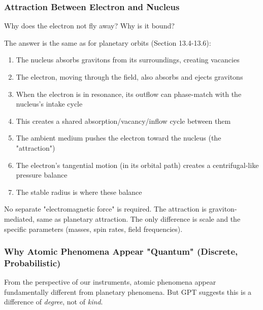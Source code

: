 \documentclass[12pt, a4paper]{article}
\begin{document}
\subsubsection{Attraction Between Electron and Nucleus}
\label{subsec:electron_attraction}

Why does the electron not fly away? Why is it bound?

The answer is the same as for planetary orbits (Section 13.4-13.6):

\begin{enumerate}
    \item The nucleus absorbs gravitons from its surroundings, creating vacancies
    \item The electron, moving through the field, also absorbs and ejects gravitons
    \item When the electron is in resonance, its outflow can phase-match with the nucleus's intake cycle
    \item This creates a shared absorption/vacancy/inflow cycle between them
    \item The ambient medium pushes the electron toward the nucleus (the "attraction")
    \item The electron's tangential motion (in its orbital path) creates a centrifugal-like pressure balance
    \item The stable radius is where these balance
\end{enumerate}

No separate "electromagnetic force" is required. The attraction is graviton-mediated, same as planetary attraction. The only difference is scale and the specific parameters (masses, spin rates, field frequencies).

\subsubsection{Why Atomic Phenomena Appear "Quantum" (Discrete, Probabilistic)}
\label{subsec:atomic_quantum_appearance}

From the perspective of our instruments, atomic phenomena appear fundamentally different from planetary phenomena. But GPT suggests this is a difference of \textit{degree}, not of \textit{kind}.
\end{document}
